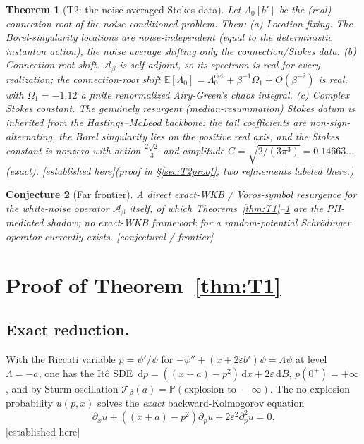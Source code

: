 \documentclass[11pt,reqno]{amsart}
\theoremstyle{plain}
\newtheorem{theorem}{Theorem}
\newtheorem{conjecture}[theorem]{Conjecture}
\theoremstyle{definition}
\theoremstyle{remark}
\newcommand{\dd}{\,\mathrm{d}}
\newcommand{\E}{\mathbb{E}}
\newcommand{\Prob}{\mathbb{P}}
\newcommand{\SAO}{\mathcal{A}_\beta}
\newcommand{\eps}{\varepsilon}
\newcommand{\tagPr}{{\footnotesize\textsf{[established here]}}}
\newcommand{\tagX}{{\footnotesize\textsf{[conjectural / frontier]}}}
\begin{document}
\begin{theorem}[T2: the noise-averaged Stokes data]\label{thm:T2}
Let $\Lambda_0[b']$ be the (real) connection root of the noise-conditioned problem. Then:
\emph{(a) Location-fixing.} The Borel-singularity locations are noise-independent (equal to the
deterministic instanton action), the noise average shifting only the connection/Stokes data.
\emph{(b) Connection-root shift.} $\SAO$ is self-adjoint, so its spectrum is real for every
realization; the connection-root shift $\E[\Lambda_0]=\Lambda_0^{\det}+\beta^{-1}\Omega_1+O(\beta^{-2})$
is \emph{real}, with $\Omega_1=-1.12$ a finite renormalized Airy-Green's chaos integral.
\emph{(c) Complex Stokes constant.} The genuinely resurgent (median-resummation) Stokes datum is
inherited from the Hastings--McLeod backbone: the tail coefficients are non-sign-alternating, the
Borel singularity lies on the positive real axis, and the Stokes constant is nonzero with action
$\tfrac{2\sqrt2}{3}$ and amplitude $C=\sqrt{2/(3\pi^3)}=0.14663\ldots$ (exact). \tagPr\emph{(proof in
\S\ref{sec:T2proof}; two refinements labeled there.)}
\end{theorem}

\begin{conjecture}[Far frontier]\label{conj:frontier}
A direct exact-WKB / Voros-symbol resurgence for the white-noise operator $\SAO$ itself, of which
Theorems~\ref{thm:T1}--\ref{thm:T2} are the PII-mediated shadow; no exact-WKB framework for a
random-potential Schr\"odinger operator currently exists. \tagX
\end{conjecture}

\section{Proof of Theorem~\ref{thm:T1}}\label{sec:T1proof}

\subsection{Exact reduction.}
With the Riccati variable $p=\psi'/\psi$ for $-\psi''+(x+2\eps b')\psi=\Lambda\psi$ at level
$\Lambda=-a$, one has the It\^o SDE $\dd p=((x+a)-p^2)\dd x+2\eps\dd B$, $p(0^+)=+\infty$, and by
Sturm oscillation $\mathcal T_\beta(a)=\Prob(\text{explosion to }-\infty)$. The no-explosion
probability $u(p,x)$ solves the \emph{exact} backward-Kolmogorov equation
\begin{equation}\label{eq:bk}
\partial_x u+((x+a)-p^2)\partial_p u+2\eps^2\partial_p^2 u=0.
\end{equation}
\tagPr
\end{document}
